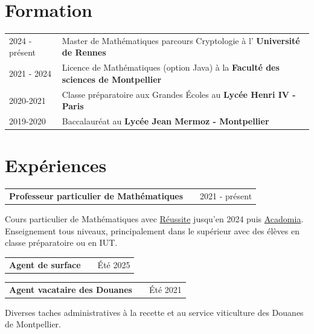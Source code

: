 \documentclass[a4paper,12pt]{article}
\makeatletter
\newenvironment{jobshort}[2]
    {
    \begin{tabularx}{\linewidth}{@{}l X r@{}}
    \textbf{#1} & \hfill &  #2 \\[3.75pt]
    \end{tabularx}
    }
    {
    }
\newenvironment{joblong}[2]
    {
    \begin{tabularx}{\linewidth}{@{}l X r@{}}
    \textbf{#1} & \hfill &  #2 \\[3.75pt]
    \end{tabularx}
    \begin{minipage}[t]{\linewidth}
    \begin{itemize}[nosep,after=\strut, leftmargin=1em, itemsep=3pt,label=--]
    }
    {
    \end{itemize}
    \end{minipage}    
    }
\makeatother
\begin{document}
\section{Formation}
\begin{tabularx}{\linewidth}{@{}l X@{}}	


2024 - présent & Master de Mathématiques parcours Cryptologie à l' \textbf{Université de Rennes} \hfill  \\ 

2021 - 2024 & Licence de Mathématiques (option Java) à la \textbf{Faculté des sciences de Montpellier} \hfill \\%

2020-2021 & Classe préparatoire aux Grandes Écoles au \textbf{Lycée Henri IV - Paris} \hfill   \\

2019-2020 & Baccalauréat au \textbf{Lycée Jean Mermoz - Montpellier} \hfill %
\end{tabularx}


\section{Expériences}

\begin{jobshort}{Professeur particulier de Mathématiques}{2021 - présent}
Cours particulier de Mathématiques avec \href{https://groupe-reussite.fr/}{Réussite} jusqu'en 2024 puis \href{https://www.acadomia.fr/}{Acadomia}. Enseignement tous niveaux, principalement dans le supérieur avec des élèves en classe préparatoire ou en IUT.
\end{jobshort}

\begin{jobshort}{Agent de surface}{Été 2025}
\end{jobshort}

\begin{jobshort}{Agent vacataire des Douanes}{Été 2021}
Diverses taches administratives à la recette et au service viticulture des Douanes de Montpellier.
\end{jobshort}   

\end{document}
